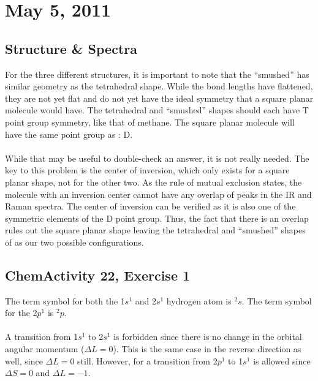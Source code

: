 \chapter{May 5, 2011}

\section{Structure \& Spectra}
For the three different structures, it is important to note that the ``smushed''  has similar geometry as the tetrahedral shape. While the bond lengths have flattened, they are not yet flat and do not yet have the ideal symmetry that a square planar molecule would have. The tetrahedral and ``smushed'' shapes should each have T point group symmetry, like that of methane. The square planar molecule will have the same point group as : D. \\ \\
While that may be useful to double-check an answer, it is not really needed. The key to this problem is the center of inversion, which only exists for a square planar shape, not for the other two. As the rule of mutual exclusion states, the molecule with an inversion center cannot have any overlap of peaks in the IR and Raman spectra. The center of inversion can be verified as it is also one of the symmetric elements of the D point group. Thus, the fact that there is an overlap rules out the square planar shape leaving the tetrahedral and ``smushed'' shapes of  as our two possible configurations.

\section{ChemActivity 22, Exercise 1}
The term symbol for both the 1$s^1$ and 2$s^1$ hydrogen atom is $^2s$. The term symbol for the 2$p^1$ is $^2p$. \\ \\
A transition from 1$s^1$ to 2$s^1$ is forbidden since there is no change in the orbital angular momentum ($\Delta L = 0$). This is the same case in the reverse direction as well, since $\Delta L = 0$ still. However, for a transition from 2$p^1$ to 1$s^1$ is allowed since $\Delta S = 0$ and $\Delta L = -1$.

